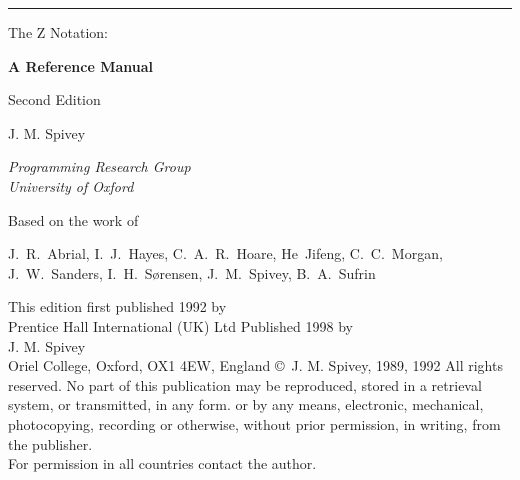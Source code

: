 


\setcounter{page}{3}	%

\thispagestyle{empty}
{\parindent=0pt \parskip=0pt
\hrule height0pt
\vskip 21pt
{\Hugebf The Z Notation:\par}
\vskip 14pt
{\LARGE\bf A Reference Manual\par}
\vskip 14pt
{\large Second Edition\par}
\vskip 28pt
{\Large J. M. Spivey\par}
\vskip 7pt
{\it Programming Research Group\\
  University of Oxford\par}
\vskip 28pt
{\large Based on the work of\par}
\vskip 7pt
{\hsize \large \raggedright \noindent
	J.~R.~Abrial, I.~J.~Hayes, C.~A.~R.~Hoare,
	He~Jifeng, C.~C.~Morgan, J.~W.~Sanders,
	I.~H.~S\o rensen, J.~M.~Spivey, B.~A.~Sufrin \par}}
\clearpage

\thispagestyle{empty}
{\raggedright
\noindent
This edition first published 1992 by\\
Prentice Hall International (UK) Ltd
\vskip 14pt
\noindent
Published 1998 by\\
J. M. Spivey\\
Oriel College, Oxford, OX1 4EW, England
\vskip 14pt
\noindent
\copyright\ J. M. Spivey, 1989, 1992
\vskip 14pt
\noindent
All rights reserved. No part of this publication may be reproduced,
stored in a retrieval system, or transmitted, in any form. or by any
means, electronic, mechanical, photocopying, recording or otherwise,
without prior permission, in writing, from the publisher.\\
For permission in all countries contact the author.
\clearpage}

